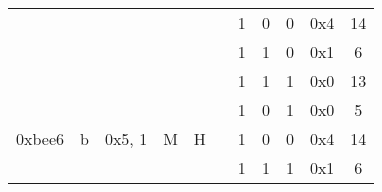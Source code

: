 \documentclass[11pt]{homework}
\newcommand{\xmark}{\ding{55}}%
\begin{document}
\begin{arabicparts}
{\begin{tabular}{|c|c|c|c|c|c|c|c|c|c|c|}
            \cline{7-11}
                                     &                                                                        &                             &                                                                   &                                                                    &                                                                      & 1                        & 0     & 0         & 0x4 & 14            \\
            \cline{7-11}
                                     &                                                                        &                             &                                                                   &                                                                    &                                                                      & 1                        & 1     & 0         & 0x1 & 6             \\
            \cline{7-11}
                                     &                                                                        &                             &                                                                   &                                                                    &                                                                      & 1                        & 1     & 1         & 0x0 & 13            \\
            \hline
            \multirow{4}{*}{0xbee6}  & \multirow{4}{*}{b}                                                     & \multirow{4}{*}{0x5, 1}     & \multirow{4}{*}{M}                                                & \multirow{4}{*}{H}                                                 & \multirow{4}{*}{\xmark}                                              & 1                        & 0     & 1         & 0x0 & 5             \\
            \cline{7-11}
                                     &                                                                        &                             &                                                                   &                                                                    &                                                                      & 1                        & 0     & 0         & 0x4 & 14            \\
            \cline{7-11}
                                     &                                                                        &                             &                                                                   &                                                                    &                                                                      & 1                        & 1     & 1         & 0x1 & 6             \\

\end{tabular}}
\end{arabicparts}
\end{document}
